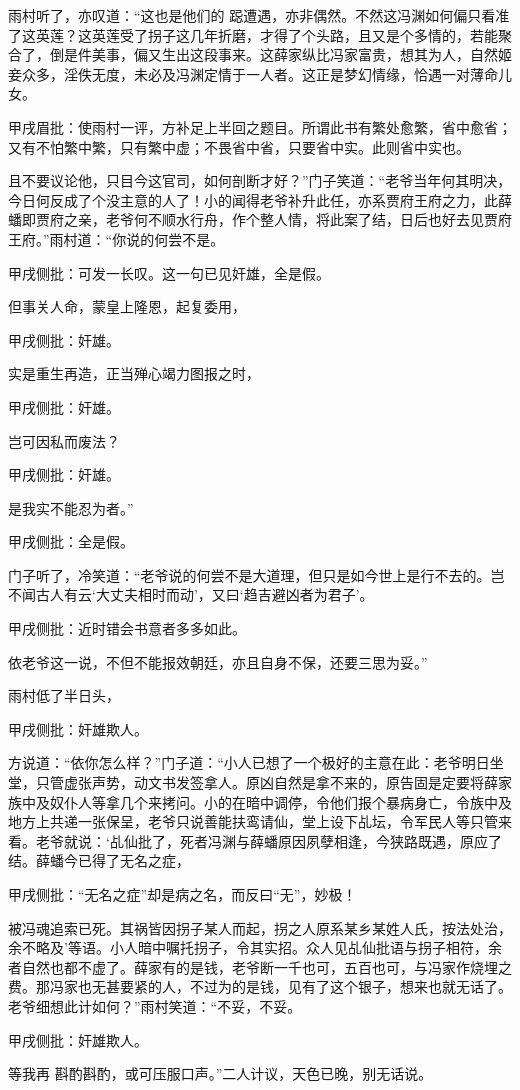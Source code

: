 \begin{parag}
    雨村听了，亦叹道：“这也是他们的 跽遭遇，亦非偶然。不然这冯渊如何偏只看准了这英莲？这英莲受了拐子这几年折磨，才得了个头路，且又是个多情的，若能聚合了，倒是件美事，偏又生出这段事来。这薛家纵比冯家富贵，想其为人，自然姬妾众多，淫佚无度，未必及冯渊定情于一人者。这正是梦幻情缘，恰遇一对薄命儿女。\begin{note}甲戌眉批：使雨村一评，方补足上半回之题目。所谓此书有繁处愈繁，省中愈省；又有不怕繁中繁，只有繁中虚；不畏省中省，只要省中实。此则省中实也。\end{note}且不要议论他，只目今这官司，如何剖断才好？”门子笑道：“老爷当年何其明决，今日何反成了个没主意的人了！小的闻得老爷补升此任，亦系贾府王府之力，此薛蟠即贾府之亲，老爷何不顺水行舟，作个整人情，将此案了结，日后也好去见贾府王府。”雨村道：“你说的何尝不是。\begin{note}甲戌侧批：可发一长叹。这一句已见奸雄，全是假。\end{note}但事关人命，蒙皇上隆恩，起复委用，\begin{note}甲戌侧批：奸雄。\end{note}实是重生再造，正当殚心竭力图报之时，\begin{note}甲戌侧批：奸雄。\end{note}岂可因私而废法？\begin{note}甲戌侧批：奸雄。\end{note}是我实不能忍为者。”\begin{note}甲戌侧批：全是假。\end{note}门子听了，冷笑道：“老爷说的何尝不是大道理，但只是如今世上是行不去的。岂不闻古人有云‘大丈夫相时而动’，又曰‘趋吉避凶者为君子’。\begin{note}甲戌侧批：近时错会书意者多多如此。\end{note}依老爷这一说，不但不能报效朝廷，亦且自身不保，还要三思为妥。”
\end{parag}


\begin{parag}
    雨村低了半日头，\begin{note}甲戌侧批：奸雄欺人。\end{note}方说道：“依你怎么样？”门子道：“小人已想了一个极好的主意在此：老爷明日坐堂，只管虚张声势，动文书发签拿人。原凶自然是拿不来的，原告固是定要将薛家族中及奴仆人等拿几个来拷问。小的在暗中调停，令他们报个暴病身亡，令族中及地方上共递一张保呈，老爷只说善能扶鸾请仙，堂上设下乩坛，令军民人等只管来看。老爷就说：‘乩仙批了，死者冯渊与薛蟠原因夙孽相逢，今狭路既遇，原应了结。薛蟠今已得了无名之症，\begin{note}甲戌侧批：“无名之症”却是病之名，而反曰“无”，妙极！\end{note}被冯魂追索已死。其祸皆因拐子某人而起，拐之人原系某乡某姓人氏，按法处治，余不略及’等语。小人暗中嘱托拐子，令其实招。众人见乩仙批语与拐子相符，余者自然也都不虚了。薛家有的是钱，老爷断一千也可，五百也可，与冯家作烧埋之费。那冯家也无甚要紧的人，不过为的是钱，见有了这个银子，想来也就无话了。老爷细想此计如何？”雨村笑道：“不妥，不妥。\begin{note}甲戌侧批：奸雄欺人。\end{note}等我再 斟酌斟酌，或可压服口声。”二人计议，天色已晚，别无话说。
\end{parag}


